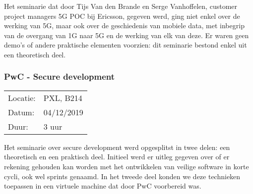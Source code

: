 Het seminarie dat door Tijs Van den Brande en Serge Vanhoffelen, customer project managers 5G POC bij Ericsson, gegeven werd, ging niet enkel over de werking van 5G, maar ook over de geschiedenis van mobiele data, met inbegrip van de overgang van 1G naar 5G en de werking van elk van deze. Er waren geen demo's of andere praktische elementen voorzien: dit seminarie bestond enkel uit een theoretisch deel.

\subsubsection{PwC - Secure development}

\begin{tabular}{l l}
  Locatie: & PXL, B214\\
  Datum: & 04/12/2019\\
  Duur: & 3 uur
\end{tabular}

Het seminarie over secure development werd opgesplitst in twee delen: een theoretisch en een praktisch deel. Initieel werd er uitleg gegeven over of er rekening gehouden kan worden met het ontwikkelen van veilige software in korte cycli, ook wel sprints genaamd. In het tweede deel konden we deze technieken toepassen in een virtuele machine dat door PwC voorbereid was.